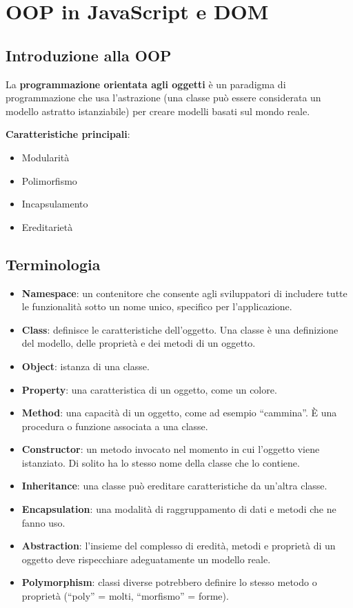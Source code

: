 \chapter{OOP in JavaScript e DOM}

\section{Introduzione alla OOP}

La \textbf{programmazione orientata agli oggetti} è un paradigma di programmazione che usa l'astrazione (una classe può essere considerata un modello astratto istanziabile) per creare modelli basati sul mondo reale.

\textbf{Caratteristiche principali}:
\begin{itemize}
    \item Modularità
    \item Polimorfismo
    \item Incapsulamento
    \item Ereditarietà
\end{itemize}

\section{Terminologia}

\begin{itemize}
    \item \textbf{Namespace}: un contenitore che consente agli sviluppatori di includere tutte le funzionalità sotto un nome unico, specifico per l'applicazione.
    \item \textbf{Class}: definisce le caratteristiche dell'oggetto. Una classe è una definizione del modello, delle proprietà e dei metodi di un oggetto.
    \item \textbf{Object}: istanza di una classe.
    \item \textbf{Property}: una caratteristica di un oggetto, come un colore.
    \item \textbf{Method}: una capacità di un oggetto, come ad esempio ``cammina''. È una procedura o funzione associata a una classe.
    \item \textbf{Constructor}: un metodo invocato nel momento in cui l'oggetto viene istanziato. Di solito ha lo stesso nome della classe che lo contiene.
    \item \textbf{Inheritance}: una classe può ereditare caratteristiche da un'altra classe.
    \item \textbf{Encapsulation}: una modalità di raggruppamento di dati e metodi che ne fanno uso.
    \item \textbf{Abstraction}: l'insieme del complesso di eredità, metodi e proprietà di un oggetto deve rispecchiare adeguatamente un modello reale.
    \item \textbf{Polymorphism}: classi diverse potrebbero definire lo stesso metodo o proprietà (``poly'' = molti, ``morfismo'' = forme).
\end{itemize}

